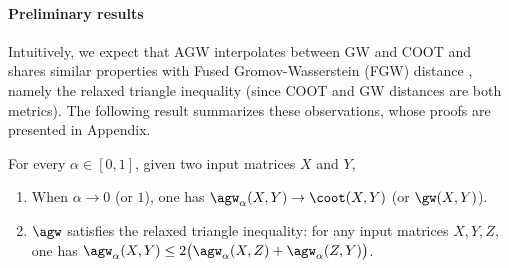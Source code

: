 \paragraph{Preliminary results}
Intuitively, we expect that AGW interpolates between GW and COOT and shares similar properties
with Fused Gromov-Wasserstein (FGW) distance \citep{Vayer19b}, namely
the relaxed triangle inequality (since COOT and GW distances are both metrics).
The following result summarizes these observations, whose proofs are presented in
Appendix.
\begin{proposition}
\label{prop:basic_prop}
For every $\alpha \in [0, 1]$, given two input matrices $X$ and $Y$,
\begin{enumerate}
    \item When $\alpha \to 0$ (or $1$), one has $\agw_{\alpha}(X, Y) \to \coot(X, Y)$ (or $\gw(X, Y)$).

    \item $\agw$ satisfies the relaxed triangle inequality: for any input matrices $X, Y, Z$,
    one has $\agw_{\alpha}(X, Y) \leq 2 \big( \agw_{\alpha}(X, Z) + \agw_{\alpha}(Z, Y) \big)$.
\end{enumerate}
\end{proposition}



